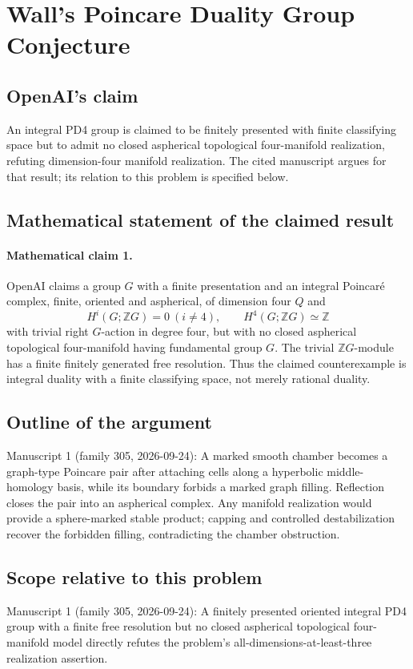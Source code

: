 \documentclass[11pt]{article}
\begin{document}
\section*{Wall's Poincare Duality Group Conjecture}

\subsection{OpenAI's claim}
An integral PD4 group is claimed to be finitely presented with finite classifying space but to admit no closed aspherical topological four-manifold realization, refuting dimension-four manifold realization. The cited manuscript argues for that result; its relation to this problem is specified below.

\subsection{Mathematical statement of the claimed result}
\paragraph{Mathematical claim 1.} OpenAI claims a group $G$ with a finite presentation and an integral Poincaré complex, finite, oriented and aspherical, of dimension four $Q$ and
\[
H^i(G;\mathbb ZG)=0\ (i\ne4),\qquad H^4(G;\mathbb ZG)\simeq\mathbb Z
\]
with trivial right $G$-action in degree four, but with no closed aspherical topological four-manifold having fundamental group $G$. The trivial $\mathbb ZG$-module has a finite finitely generated free resolution. Thus the claimed counterexample is integral duality with a finite classifying space, not merely rational duality.

\subsection{Outline of the argument}
Manuscript 1 (family 305, 2026-09-24): A marked smooth chamber becomes a graph-type Poincare pair after attaching cells along a hyperbolic middle-homology basis, while its boundary forbids a marked graph filling. Reflection closes the pair into an aspherical complex. Any manifold realization would provide a sphere-marked stable product; capping and controlled destabilization recover the forbidden filling, contradicting the chamber obstruction.

\subsection{Scope relative to this problem}
Manuscript 1 (family 305, 2026-09-24): A finitely presented oriented integral PD4 group with a finite free resolution but no closed aspherical topological four-manifold model directly refutes the problem’s all-dimensions-at-least-three realization assertion.
\end{document}
